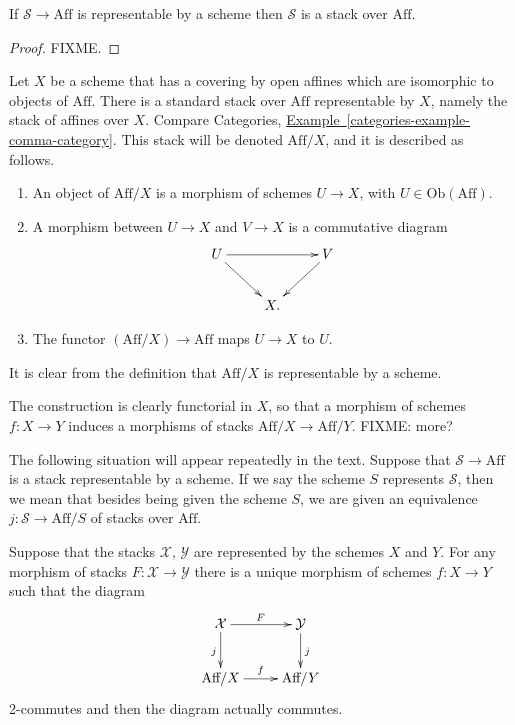 \begin{lemma}
\label{lemma-representable-by-scheme-implies-stack}
If $\mathcal{S} \to \text{Aff}$ is representable by a scheme then $\mathcal{S}$
is a stack over $\text{Aff}$.
\end{lemma}

\begin{proof}
FIXME.
\end{proof}

\begin{example}
\label{example-standard-representable-scheme}
Let $X$ be a scheme that has a covering by open affines which are isomorphic
to objects of $\text{Aff}$. There is a standard stack over $\text{Aff}$
representable by $X$, namely the stack of affines over $X$. Compare Categories,
\hyperref[categories-example-comma-category]%
{Example~\ref*{categories-example-comma-category}}.
This stack will be denoted $\text{Aff}/X$, and it is described as follows.
\begin{enumerate}
\item An object of $\text{Aff}/X$ is a morphism of schemes
$U \to X$, with $U \in \text{Ob}(\text{Aff})$.
\item A morphism between $U\to X$ and $V \to X$ is a commutative diagram
$$
\xymatrix{
U \ar[rr] \ar[rd] && V \ar[ld] \\
&X.&}
$$
\item The functor $(\text{Aff}/X) \to \text{Aff}$ maps $U\to X$ to $U$.
\end{enumerate}
It is clear from the definition that $\text{Aff}/X$ is representable by
a scheme. 

\smallskip\noindent
The construction is clearly functorial in $X$, so that a morphism
of schemes $f : X \to Y$ induces a morphisms of stacks 
$\text{Aff}/X \to \text{Aff}/Y$. FIXME: more?
\end{example}

\begin{situation}
\label{situation-stack-represented-by-scheme}
The following situation will appear repeatedly in the text. Suppose that
$\mathcal{S} \to \text{Aff}$ is a stack representable by a scheme. If we
say the scheme $S$ represents $\mathcal{S}$, then we mean that besides 
being given the scheme $S$, we are given an equivalence $j : \mathcal{S}
\to \text{Aff}/S$ of stacks over $\text{Aff}$.
\end{situation}

\begin{lemma}
\label{lemma-morphism-stacks-representable-by-schemes}
Suppose that the stacks $\mathcal{X}$, $\mathcal{Y}$ are represented
by the schemes $X$ and $Y$. For any morphism of stacks $F : \mathcal{X}
\to \mathcal{Y}$ there is a unique morphism of schemes $f : X \to Y$
such that the diagram
$$
\xymatrix{
\mathcal{X} \ar[r]^F \ar[d]_j & \mathcal{Y} \ar[d]^j \\
\text{Aff}/X \ar[r]^f & \text{Aff}/Y}
$$
2-commutes and then the diagram actually commutes.
\end{lemma}

